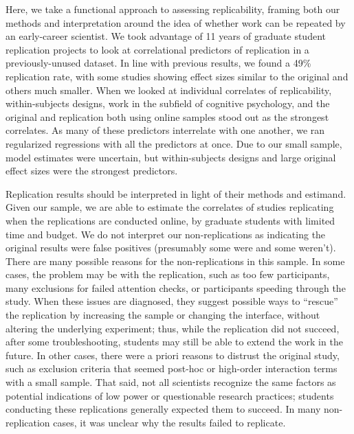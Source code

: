 \documentclass[
  english,
  a4paper,
]{article}
\begin{document}
Here, we take a functional approach to assessing replicability, framing both our methods and interpretation around the idea of whether work can be repeated by an early-career scientist. We took advantage of 11 years of graduate student replication projects to look at correlational predictors of replication in a previously-unused dataset. In line with previous results, we found a 49\% replication rate, with some studies showing effect sizes similar to the original and others much smaller. When we looked at individual correlates of replicability, within-subjects designs, work in the subfield of cognitive psychology, and the original and replication both using online samples stood out as the strongest correlates. As many of these predictors interrelate with one another, we ran regularized regressions with all the predictors at once. Due to our small sample, model estimates were uncertain, but within-subjects designs and large original effect sizes were the strongest predictors.

Replication results should be interpreted in light of their methods and estimand. Given our sample, we are able to estimate the correlates of studies replicating when the replications are conducted online, by graduate students with limited time and budget. We do not interpret our non-replications as indicating the original results were false positives (presumably some were and some weren't). There are many possible reasons for the non-replications in this sample. In some cases, the problem may be with the replication, such as too few participants, many exclusions for failed attention checks, or participants speeding through the study. When these issues are diagnosed, they suggest possible ways to ``rescue'' the replication by increasing the sample or changing the interface, without altering the underlying experiment; thus, while the replication did not succeed, after some troubleshooting, students may still be able to extend the work in the future. In other cases, there were a priori reasons to distrust the original study, such as exclusion criteria that seemed post-hoc or high-order interaction terms with a small sample. That said, not all scientists recognize the same factors as potential indications of low power or questionable research practices; students conducting these replications generally expected them to succeed. In many non-replication cases, it was unclear why the results failed to replicate.
\end{document}
